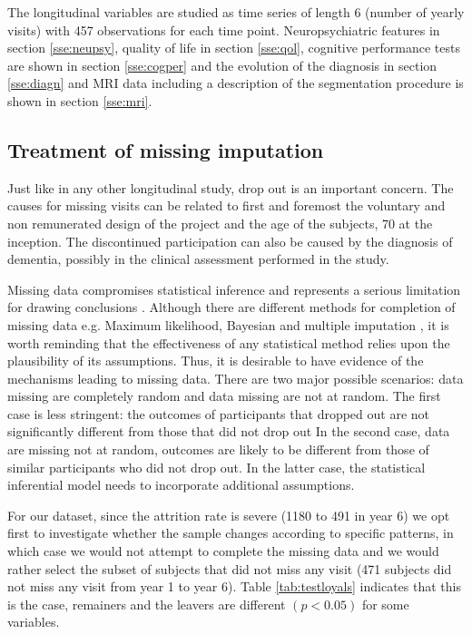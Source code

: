 \documentclass[11pt]{article}
\theoremstyle{definition}
\theoremstyle{remark}
\begin{document}
The longitudinal variables are studied as time series of length 6 (number of yearly visits) with 457 observations for each time point. Neuropsychiatric features in section \ref{sse:neupsy}, quality of life in section \ref{sse:qol}, cognitive performance tests are shown in section \ref{sse:cogper} and the evolution of the diagnosis in section \ref{sse:diagn} and MRI data including a description of the segmentation procedure is shown in section \ref{sse:mri}. 

\subsection{Treatment of missing imputation}
\label{sse:miss}
Just like in any other longitudinal study, drop out is an important concern. The causes for missing visits can be related to first and foremost the voluntary and non remunerated design of the project and the age of the subjects, 70 at the inception. The discontinued participation can also be caused by the diagnosis of dementia, possibly in the clinical assessment performed in the study.

Missing data compromises statistical inference and represents a serious limitation for drawing conclusions \cite{little2012prevention}. 
Although there are different methods for completion of missing data e.g. Maximum likelihood, Bayesian and multiple imputation \cite{hogan2004handling}, it is worth reminding that the effectiveness of any statistical method relies upon the plausibility of its assumptions. Thus, it is desirable to have evidence of the mechanisms leading to missing data. There are two major possible scenarios: data missing are completely random and data missing are not at random. The first case is less stringent: the outcomes of participants that dropped out are not significantly different from those that did not drop out
In the second case, data are missing not at random, outcomes are likely to be different from those of similar participants who did not drop out. In the latter case, the statistical inferential model needs to incorporate additional assumptions. 

For our dataset, since the attrition rate is severe (1180 to 491 in year 6) we opt first to investigate whether the sample changes according to specific patterns, in which case we would not attempt to complete the missing data and we would rather select the subset of subjects that did not miss any visit (471 subjects did not miss any visit from year 1 to year 6). Table \ref{tab:testloyals} indicates that this is the case, remainers and the leavers are different $(p <0.05)$ for some variables. 
\end{document}
